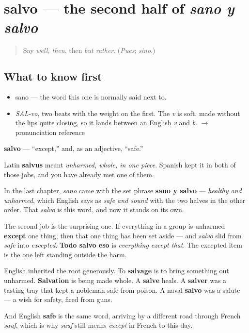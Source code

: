 \section[salvo]{salvo — the second half of \emph{sano y salvo}}

\label{lesson:ES-C329-salvo}



\begin{quote}
Say \emph{well, then}, then \emph{but rather}. (\emph{Pues}; \emph{sino}.)
\end{quote}

\subsection*{What to know first}
\begin{itemize}
\raggedright
  \item sano — the word this one is normally said next to.
\end{itemize}

\begin{sounds}
\begin{itemize}
\raggedright
  \item \emph{SAL-vo}, two beats with the weight on the first. The \emph{v} is soft, made without the lips quite closing, so it lands between an English \emph{v} and \emph{b}. $\to$ pronunciation reference
\end{itemize}
\end{sounds}

\begin{cousinweb}
\textbf{salvo} — \textquotedblleft{}except,\textquotedblright{} and, as an adjective, \textquotedblleft{}safe.\textquotedblright{}

Latin \textbf{salvus} meant \emph{unharmed, whole, in one piece}. Spanish kept it in both of those jobs, and you have already met one of them.

In the last chapter, \emph{sano} came with the set phrase \textbf{sano y salvo} — \emph{healthy and unharmed}, which English says as \emph{safe and sound} with the two halves in the other order. That \emph{salvo} is this word, and now it stands on its own.

The second job is the surprising one. If everything in a group is unharmed \textbf{except} one thing, then that one thing has been set aside — and \emph{salvo} slid from \emph{safe} into \emph{excepted}. \textbf{Todo salvo eso} is \emph{everything except that}. The excepted item is the one left standing outside the harm.

English inherited the root generously. To \textbf{salvage} is to bring something out unharmed. \textbf{Salvation} is being made whole. A \textbf{salve} heals. A \textbf{salver} was a tasting-tray that kept a nobleman safe from poison. A naval \textbf{salvo} was a salute — a wish for safety, fired from guns.

And English \textbf{safe} is the same word, arriving by a different road through French \emph{sauf}, which is why \emph{sauf} still means \emph{except} in French to this day.
\end{cousinweb}

